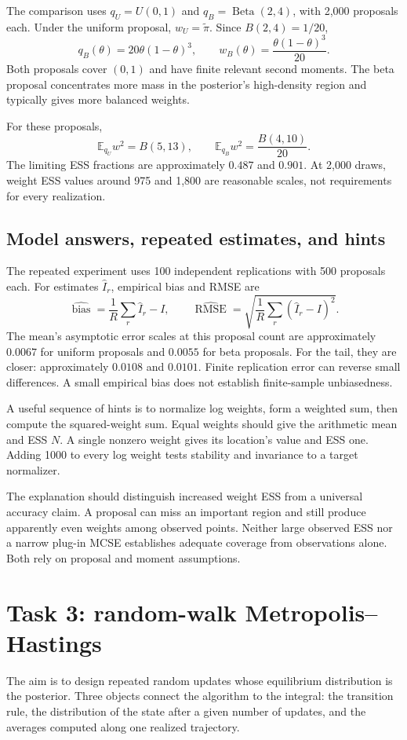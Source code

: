 \documentclass[11pt,a4paper]{article}
\newcommand{\E}{\mathbb E}
\begin{document}
The comparison uses $q_U=U(0,1)$ and $q_B=\operatorname{Beta}(2,4)$,
with 2,000 proposals each. Under the uniform proposal,
$w_U=\widetilde\pi$. Since $B(2,4)=1/20$,
\[
 q_B(\theta)=20\theta(1-\theta)^3,\qquad
 w_B(\theta)=\frac{\theta(1-\theta)^3}{20}.
\]
Both proposals cover $(0,1)$ and have finite relevant second moments. The
beta proposal concentrates more mass in the posterior's high-density region
and typically gives more balanced weights.

For these proposals,
\[
 \E_{q_U}w^2=B(5,13),\qquad
 \E_{q_B}w^2=\frac{B(4,10)}{20}.
\]
The limiting ESS fractions are approximately $0.487$ and $0.901$.
At 2,000 draws, weight ESS values around 975 and 1,800 are reasonable
scales, not requirements for every realization.

\subsection{Model answers, repeated estimates, and hints}
The repeated experiment uses 100 independent replications with 500 proposals
each. For estimates $\widehat I_r$, empirical bias and RMSE are
\[
 \widehat{\operatorname{bias}}=\frac1R\sum_r\widehat I_r-I,\qquad
 \widehat{\operatorname{RMSE}}=
 \sqrt{\frac1R\sum_r(\widehat I_r-I)^2}.
\]
The mean's asymptotic error scales at this proposal count are approximately
$0.0067$ for uniform proposals and $0.0055$ for beta proposals. For the tail,
they are closer: approximately $0.0108$ and $0.0101$. Finite replication
error can reverse small differences. A small empirical bias does not establish
finite-sample unbiasedness.

A useful sequence of hints is to normalize log weights, form a weighted sum,
then compute the squared-weight sum. Equal weights should give the arithmetic
mean and ESS $N$. A single nonzero weight gives its location's value and ESS
one. Adding 1000 to every log weight tests stability and invariance to a
target normalizer.

The explanation should distinguish increased weight ESS from a universal
accuracy claim. A proposal can miss an important region and still produce
apparently even weights among observed points. Neither large observed ESS
nor a narrow plug-in MCSE establishes adequate coverage from observations
alone. Both rely on proposal and moment assumptions.

\section{Task 3: random-walk Metropolis--Hastings}
The aim is to design repeated random updates whose equilibrium distribution
is the posterior. Three objects connect the algorithm to the integral:
the transition rule, the distribution of the state after a given number of
updates, and the averages computed along one realized trajectory.
\end{document}
